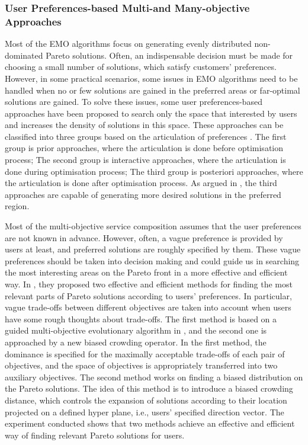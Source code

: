 \subsubsection{User Preferences-based Multi-and Many-objective Approaches}\label{PreferencesMultiObjective}
Most of the EMO algorithms focus on generating evenly distributed non-dominated Pareto solutions. Often, an indispensable decision must be made for choosing a small number of solutions, which satisfy customers' preferences. However, in some practical scenarios, some issues in EMO algorithms need to be handled when no or few solutions are gained in the preferred areas or far-optimal solutions are gained. To solve these issues, some user preferences-based approaches have been proposed to search only the space that interested by users and increases the density of solutions in this space. These approaches can be classified into three groups based on the articulation of preferences \cite{van2000multiobjective}. The first group is prior approaches, where the articulation is done before optimisation process; The second group is interactive approaches, where the articulation is done during optimisation process; The third group is posteriori approaches, where the articulation is done after optimisation process. As argued in \cite{giagkiozis2014pareto}, the third approaches are capable of generating more desired solutions in the preferred region. 


Most of the multi-objective service composition assumes that the user preferences are not known in advance. However,  often, a vague preference is provided by users at least, and preferred solutions are roughly specified by them.  These vague preferences should be taken into decision making and could guide us in searching the most interesting areas on the Pareto front in a more effective and efficient way. In \cite{branke2005integrating}, they proposed two effective and efficient methods for finding the most relevant parts of Pareto solutions according to users' preferences. In particular, vague trade-offs between different objectives are taken into account when users have some rough thoughts about trade-offs.  The first method is based on a guided multi-objective evolutionary algorithm in \cite{branke2001guidance}, and the second one is approached by a new biased crowding operator. In the first method, the dominance is specified for the maximally acceptable trade-offs of each pair of objectives, and the space of objectives is appropriately transferred into two auxiliary objectives. The second method works on finding a biased distribution on the Pareto solutions. The idea of this method is to introduce a biased crowding distance, which controls the expansion of solutions according to their location projected on a defined hyper plane, i.e., users' specified direction vector.  The experiment conducted shows that two methods achieve an effective and efficient way of finding relevant Pareto solutions for users.

